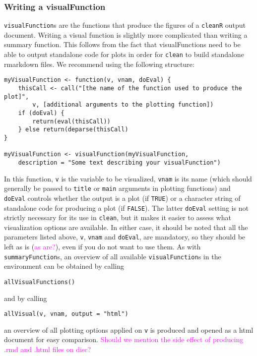 \documentclass[article]{jss}
\newcommand{\hl}[1]{\textcolor{magenta}{#1}}
\newcommand{\R}[1]{\texttt{#1}}
\begin{document}
\subsubsection{Writing a visualFunction}
\R{visualFunction}s are the functions that produce the figures of a \R{cleanR} output document. Writing a visual function is slightly more complicated than writing a summary function. This follows from the fact that visualFunctions need to be able to output standalone code for plots in order for \R{clean} to build standalone rmarkdown files. We recommend using the following structure:
\begin{Verbatim}
myVisualFunction <- function(v, vnam, doEval) {
	thisCall <- call("[the name of the function used to produce the plot]", 
		v, [additional arguments to the plotting function])
	if (doEval) {
		return(eval(thisCall))
	} else return(deparse(thisCall)
}

myVisualFunction <- visualFunction(myVisualFunction, 
	description = "Some text describing your visualFunction")
\end{Verbatim}
In this function, \R{v} is the variable to be visualized, \R{vnam} is its name (which should generally be passed to \R{title} or \R{main} arguments in plotting functions) and \R{doEval} controls whether the output is a plot (if \R{TRUE}) or a character string of standalone code for producing a plot (if \R{FALSE}). The latter \R{doEval} setting is not strictly necessary for its use in \R{clean}, but it makes it easier to assess what visualization options are available. In either case, it should be noted that all the parameters listed above, \R{v}, \R{vnam} and \R{doEval}, are mandatory, so they should be left as is (\hl{as are?}), even if you do not want to use them. As with \R{summaryFunction}s, an overview of all available \R{visualFunction}s in the environment can be obtained by calling
\begin{Verbatim}
allVisualFunctions()
\end{Verbatim}
and by calling 
\begin{Verbatim}
allVisual(v, vnam, output = "html")
\end{Verbatim}
an overview of all plotting options applied on \R{v} is produced and opened as a html document for easy comparison. \hl{Should we mention the side effect of producing .rmd and .html files on disc?}
\end{document}
